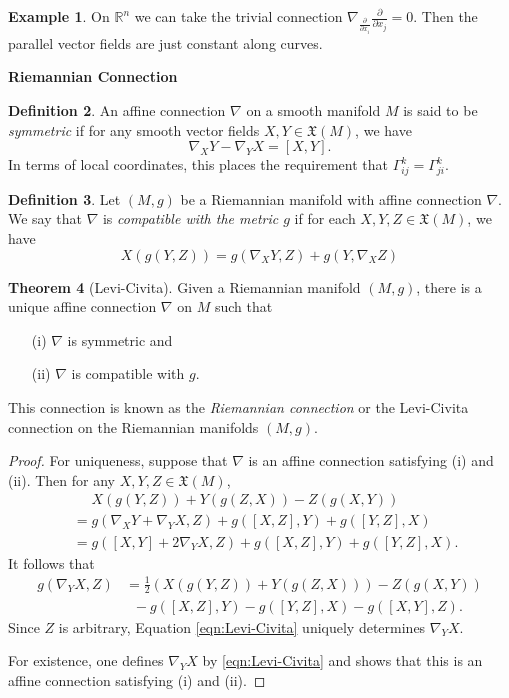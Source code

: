 \documentclass{amsart}
\numberwithin{equation}{section}
\newcommand{\bR}{\mathbb{R}}
\newcommand{\fX}{\mathfrak{X}}
\theoremstyle{definition}
\newtheorem{definition}{Definition} [section]
\newtheorem{example}[definition]{Example}
\theoremstyle{theorem}
\newtheorem{theorem}[definition]{Theorem}
\begin{document}
\begin{example}
On $\bR^n$ we can take the trivial connection $\nabla_{\frac{\partial}{\partial x_i}} \frac{\partial}{\partial x_j} = 0$. Then the parallel vector fields are just constant along curves.
\end{example}


\newpage

\noindent 
{\bf \Large Riemannian Connection}

\begin{definition}
An affine connection $\nabla$ on a smooth manifold $M$ is said to be {\em symmetric} if for any smooth vector fields $X,Y \in \mathfrak{X}(M)$, we have 
\[
\nabla_XY - \nabla_Y X = [X,Y].
\]
In terms of local coordinates, this places the requirement that $\Gamma_{ij}^k = \Gamma_{ji}^k$. 
\end{definition}



\begin{definition}
Let $(M,g)$ be a Riemannian manifold with affine connection $\nabla$. We say that $\nabla$ is 
{\em compatible with the metric $g$} if for each $X,Y,Z \in \fX(M)$, we have 
\[
X(g(Y,Z)) = g(\nabla_XY, Z) + g(Y, \nabla_XZ)
\]
\end{definition}

\begin{theorem}[Levi-Civita]
Given a Riemannian manifold $(M,g)$, there is a unique affine connection $\nabla$ on $M$ such that 
\begin{enumerate}
\item[(i)] $\nabla$ is symmetric and 
\item[(ii)] $\nabla$ is compatible with $g$. 
\end{enumerate}
This connection is known as the {\em Riemannian connection} or the {Levi-Civita connection}
on the Riemannian manifolds $(M,g)$. 
\end{theorem}

\begin{proof}
For uniqueness, suppose that $\nabla$ is an affine connection satisfying (i) and (ii). Then
for any $X,Y,Z\in \fX(M)$,
\begin{align*}
&\;\;\;\;\:X(g(Y,Z)) + Y(g(Z,X)) - Z(g(X,Y)) \\
&= g(\nabla_X Y + \nabla_YX, Z) + g([X,Z], Y) + g([Y,Z], X) \\
&= g([X,Y] + 2 \nabla_YX, Z) + g([X,Z], Y) + g([Y,Z], X).
\end{align*}
It follows that 
\begin{equation}\label{eqn:Levi-Civita}
\begin{aligned}
 g(\nabla_YX, Z) &= \frac{1}{2}\left(X(g(Y,Z)) + Y(g(Z,X))\right) -Z(g(X,Y)) \\
 &\;\; - g([X,Z], Y) - g([Y,Z], X) - g([X,Y],Z).
\end{aligned}
\end{equation}
Since $Z$ is arbitrary, Equation \eqref{eqn:Levi-Civita} uniquely determines $\nabla_YX$. 

For existence, one defines $\nabla_YX$ by \eqref{eqn:Levi-Civita} and shows that this is an affine connection satisfying (i) and (ii). 
\end{proof}
\end{document}
